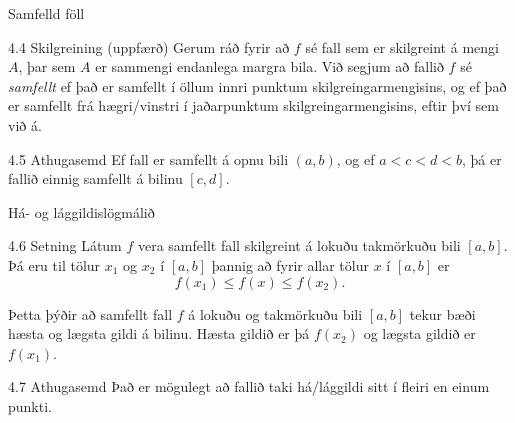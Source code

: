 \documentclass[icelandic,a4paper,12pt]{article}
\begin{document}
\begin{frame}{Samfelld föll}
 \begin{block}{4.4 Skilgreining (uppfærð)}
 Gerum ráð fyrir að $f$ sé fall sem er skilgreint á
 mengi $A$, þar sem $A$ er sammengi endanlega margra bila.
 Við segjum að fallið $f$ sé \emph{samfellt} ef það er samfellt í 
 öllum innri punktum skilgreingarmengisins, og ef það er samfellt
 frá hægri/vinstri í jaðarpunktum skilgreingarmengisins,
 eftir því sem við á.
\end{block}
\pause
\begin{block}{4.5 Athugasemd}
	Ef fall er samfellt á opnu bili $(a,b)$, og ef 
	$a<c<d<b$, þá er fallið einnig samfellt á bilinu 
	$[c,d]$.
 \end{block}
\end{frame}

\begin{frame}{Há- og lággildislögmálið}
 \begin{block}{4.6 Setning}
 Látum $f$ vera samfellt fall skilgreint á lokuðu takmörkuðu bili
  $[a,b]$.  Þá eru til tölur $x_1$ og $x_2$ í $[a,b]$ þannig að 
fyrir allar tölur $x$ í $[a,b]$ er
$$f(x_1)\leq f(x)\leq f(x_2).$$

\pause

Þetta þýðir að samfellt fall $f$ á lokuðu og takmörkuðu
bili $[a,b]$ tekur bæði hæsta og lægsta gildi á bilinu. \pause
Hæsta
gildið er þá $f(x_2)$ og lægsta gildið er $f(x_1)$.
\end{block}

\pause
 
\begin{block}{4.7 Athugasemd}
 Það er mögulegt að fallið taki há/lággildi
 sitt í fleiri en einum punkti.
\end{block}
\end{frame}
\end{document}

